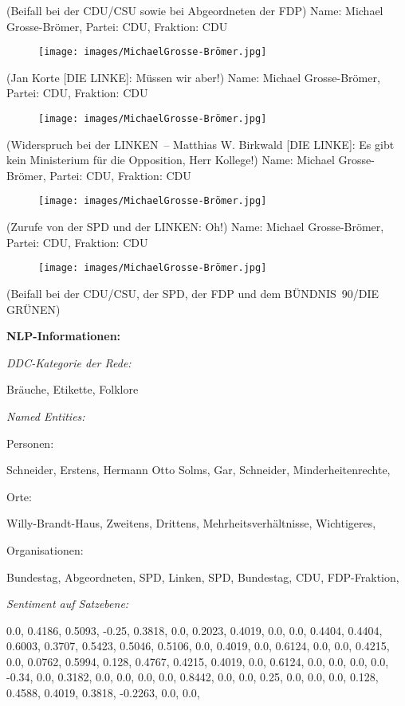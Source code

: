 \documentclass[10pt, a4paper]{report}
\begin{document}
(Beifall bei der CDU/CSU sowie bei Abgeordneten der FDP)
Name: Michael Grosse-Brömer, Partei: CDU, Fraktion: CDU

\begin{figure}[!ht]
\texttt{[image: images/MichaelGrosse-Brömer.jpg]}
\end{figure}


(Jan Korte [DIE LINKE]: Müssen wir aber!)
Name: Michael Grosse-Brömer, Partei: CDU, Fraktion: CDU

\begin{figure}[!ht]
\texttt{[image: images/MichaelGrosse-Brömer.jpg]}
\end{figure}


(Widerspruch bei der LINKEN – Matthias W. Birkwald [DIE LINKE]: Es gibt kein Ministerium für die Opposition, Herr Kollege!)
Name: Michael Grosse-Brömer, Partei: CDU, Fraktion: CDU

\begin{figure}[!ht]
\texttt{[image: images/MichaelGrosse-Brömer.jpg]}
\end{figure}


(Zurufe von der SPD und der LINKEN: Oh!)
Name: Michael Grosse-Brömer, Partei: CDU, Fraktion: CDU

\begin{figure}[!ht]
\texttt{[image: images/MichaelGrosse-Brömer.jpg]}
\end{figure}


(Beifall bei der CDU/CSU, der SPD, der FDP und dem BÜNDNIS 90/DIE GRÜNEN)


\textbf{NLP-Informationen:}

\textit{DDC-Kategorie der Rede:}

Bräuche, Etikette, Folklore

\textit{Named Entities:}

Personen:

Schneider, Erstens, Hermann Otto Solms, Gar, Schneider, Minderheitenrechte, 

Orte:

Willy-Brandt-Haus, Zweitens, Drittens, Mehrheitsverhältnisse, Wichtigeres, 

Organisationen:

Bundestag, Abgeordneten, SPD, Linken, SPD, Bundestag, CDU, FDP-Fraktion, 

\textit{Sentiment auf Satzebene:}

0.0, 0.4186, 0.5093, -0.25, 0.3818, 0.0, 0.2023, 0.4019, 0.0, 0.0, 0.4404, 0.4404, 0.6003, 0.3707, 0.5423, 0.5046, 0.5106, 0.0, 0.4019, 0.0, 0.6124, 0.0, 0.0, 0.4215, 0.0, 0.0762, 0.5994, 0.128, 0.4767, 0.4215, 0.4019, 0.0, 0.6124, 0.0, 0.0, 0.0, 0.0, -0.34, 0.0, 0.3182, 0.0, 0.0, 0.0, 0.0, 0.8442, 0.0, 0.0, 0.25, 0.0, 0.0, 0.0, 0.128, 0.4588, 0.4019, 0.3818, -0.2263, 0.0, 0.0, 
\end{document}
